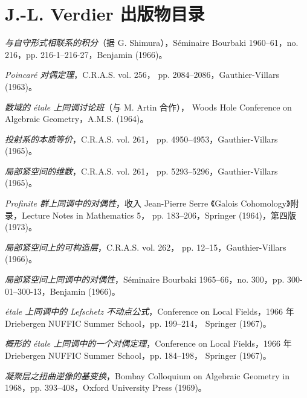 \clearpage
{}
\chapter*{J.-L. Verdier 出版物目录}

\small
\begin{description}
\item[{[01]}] \emph{与自守形式相联系的积分}（据 G. Shimura），Séminaire
Bourbaki 1960--61，no. 216，pp. 216-1--216-27，Benjamin (1966)。

\item[{[02]}] \emph{Poincaré 对偶定理}，C.R.A.S. vol. 256，
pp. 2084--2086，Gauthier-Villars (1963)。

\item[{[03]}] \emph{数域的 étale 上同调讨论班}（与 M. Artin 合作），
Woods Hole Conference on Algebraic Geometry，A.M.S. (1964)。

\item[{[04]}] \emph{投射系的本质等价}，C.R.A.S. vol. 261，
pp. 4950--4953，Gauthier-Villars (1965)。

\item[{[05]}] \emph{局部紧空间的维数}，C.R.A.S. vol. 261，
pp. 5293--5296，Gauthier-Villars (1965)。

\item[{[06]}] \emph{Profinite 群上同调中的对偶性}，收入 Jean-Pierre Serre
《Galois Cohomology》附录，Lecture Notes in Mathematics 5，
pp. 183--206，Springer (1964)，第四版 (1973)。

\item[{[07]}] \emph{局部紧空间上的可构造层}，C.R.A.S. vol. 262，
pp. 12--15，Gauthier-Villars (1966)。

\item[{[08]}] \emph{局部紧空间上同调中的对偶性}，Séminaire Bourbaki
1965--66，no. 300，pp. 300-01--300-13，Benjamin (1966)。

\item[{[09]}] \emph{étale 上同调中的 Lefschetz 不动点公式}，Conference
on Local Fields，1966 年 Driebergen NUFFIC Summer School，pp. 199--214，
Springer (1967)。

\item[{[10]}] \emph{概形的 étale 上同调中的一个对偶定理}，Conference
on Local Fields，1966 年 Driebergen NUFFIC Summer School，pp. 184--198，
Springer (1967)。

\item[{[11]}] \emph{凝聚层之扭曲逆像的基变换}，Bombay Colloquium on
Algebraic Geometry in 1968，pp. 393--408，Oxford University Press
(1969)。
\end{description}
\normalsize
